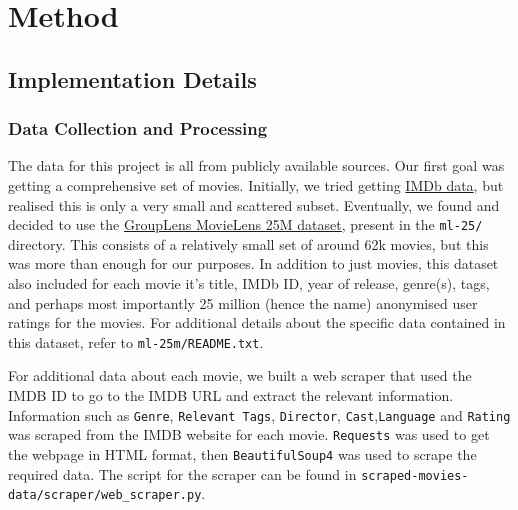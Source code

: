 \documentclass[11pt]{article}
\begin{document}
    \hypertarget{method}{%
\section{Method}\label{method}}

\hypertarget{implementation-details}{%
\subsection{Implementation Details}\label{implementation-details}}

\hypertarget{data-collection-and-processing}{%
\subsubsection{Data Collection and
Processing}\label{data-collection-and-processing}}

The data for this project is all from publicly available sources. Our
first goal was getting a comprehensive set of movies. Initially, we
tried getting \href{https://www.imdb.com/interfaces/}{IMDb data}, but
realised this is only a very small and scattered subset. Eventually, we
found and decided to use the
\href{https://grouplens.org/datasets/movielens/}{GroupLens MovieLens 25M
dataset}, present in the \texttt{ml-25/} directory. This consists of a
relatively small set of around 62k movies, but this was more than enough
for our purposes. In addition to just movies, this dataset also included
for each movie it's title, IMDb ID, year of release, genre(s), tags, and
perhaps most importantly 25 million (hence the name) anonymised user
ratings for the movies. For additional details about the specific data
contained in this dataset, refer to \texttt{ml-25m/README.txt}.

    For additional data about each movie, we built a web scraper that used
the IMDB ID to go to the IMDB URL and extract the relevant information.
Information such as \texttt{Genre}, \texttt{Relevant\ Tags},
\texttt{Director}, \texttt{Cast},\texttt{Language} and \texttt{Rating}
was scraped from the IMDB website for each movie. \texttt{Requests} was
used to get the webpage in HTML format, then \texttt{BeautifulSoup4} was
used to scrape the required data. The script for the scraper can be
found in \texttt{scraped-movies-data/scraper/web\_scraper.py}.
\end{document}
